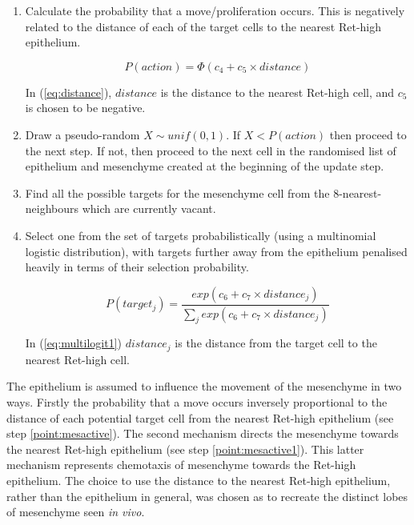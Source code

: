 \documentclass[pdftex,10pt,a4paper,twocolumn]{article}
\begin{document}
\begin{enumerate}
\item Calculate the probability that a move/proliferation occurs. This is negatively related to the distance of each of the target cells to the nearest Ret-high epithelium.\label{point:mesactive}

\begin{equation}\label{eq:distance}
P(action) = \Phi(c_4 + c_5 \times distance)
\end{equation}

In (\ref{eq:distance}), $distance$ is the distance to the nearest Ret-high cell, and $c_5$ is chosen to be negative.

\item Draw a pseudo-random $X\sim unif(0,1)$. If $X<P(action)$ then proceed to the next step. If not, then proceed to the next cell in the randomised list of epithelium and mesenchyme created at the beginning of the update step.
\item Find all the possible targets for the mesenchyme cell from the 8-nearest-neighbours which are currently vacant. 
\item Select one from the set of targets probabilistically (using a multinomial logistic distribution), with targets further away from the epithelium penalised heavily in terms of their selection probability.\label{point:mesactive1}

\begin{equation} \label{eq:multilogit1}
P(target_j) = \frac{exp(c_6 + c_7\times distance_j)}{\sum\limits_{j} exp(c_6 + c_7\times distance_j)}
\end{equation}

In (\ref{eq:multilogit1}) $distance_j$ is the distance from the target cell to the nearest Ret-high cell.

\end{enumerate}

The epithelium is assumed to influence the movement of the mesenchyme in two ways. Firstly the probability that a move occurs inversely proportional to the distance of each potential target cell from the nearest Ret-high epithelium (see step \ref{point:mesactive}). The second mechanism directs the mesenchyme towards the nearest Ret-high epithelium (see step \ref{point:mesactive1}). This latter mechanism represents chemotaxis of mesenchyme towards the Ret-high epithelium. The choice to use the distance to the nearest Ret-high epithelium, rather than the epithelium in general, was chosen as to recreate the distinct lobes of mesenchyme seen \textit{in vivo}.
\end{document}
